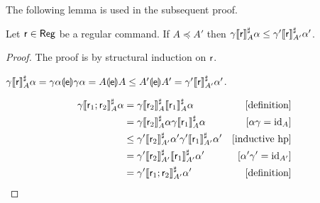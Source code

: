 The following lemma is used in the subsequent proof.
\begin{lemma}\label{lmm:app:comp-abs-monotone-domain}
	Let $\mathsf{r} \in \mathsf{Reg}$ be a regular command. If $A \preceq A'$ then $\gamma \llbracket\mathsf{r}\rrbracket^{\sharp}_{A} \alpha \le \gamma' \llbracket\mathsf{r}\rrbracket^{\sharp}_{A'} \alpha'$.
\end{lemma}
\begin{proof}
	The proof is by structural induction on $\mathsf{r}$.

	\proofcase{($\regr = \expe$)}
	$\gamma \llbracket\mathsf{r}\rrbracket^{\sharp}_A \alpha = \gamma \alpha \llparenthesis\mathsf{e}\rrparenthesis \gamma \alpha = A \llparenthesis\mathsf{e}\rrparenthesis A \le A' \llparenthesis\mathsf{e}\rrparenthesis A' = \gamma' \llbracket\mathsf{r}\rrbracket^{\sharp}_{A'} \alpha'$.

	\begin{align*}
		\gamma \llbracket\mathsf{r}_1; \mathsf{r}_2\rrbracket^{\sharp}_A \alpha & = \gamma \llbracket\mathsf{r}_2\rrbracket^{\sharp}_A \llbracket\mathsf{r}_1\rrbracket^{\sharp}_A \alpha                           & [\text{definition}]          \\
		                                                  & = \gamma \llbracket\mathsf{r}_2\rrbracket^{\sharp}_A \alpha \gamma \llbracket\mathsf{r}_1\rrbracket^{\sharp}_A \alpha             & [\alpha \gamma = \text{id}_A]      \\
		                                                  & \le \gamma' \llbracket\mathsf{r}_2\rrbracket^{\sharp}_{A'} \alpha' \gamma' \llbracket\mathsf{r}_1\rrbracket^{\sharp}_{A'} \alpha' & [\text{inductive hp}]        \\
		                                                  & = \gamma' \llbracket\mathsf{r}_2\rrbracket^{\sharp}_{A'} \llbracket\mathsf{r}_1\rrbracket^{\sharp}_{A'} \alpha'                   & [\alpha' \gamma' = \text{id}_{A'}] \\
		                                                  & = \gamma' \llbracket\mathsf{r}_1; \mathsf{r}_2\rrbracket^{\sharp}_{A'} \alpha'                                        & [\text{definition}]
	\end{align*}


\end{proof}
